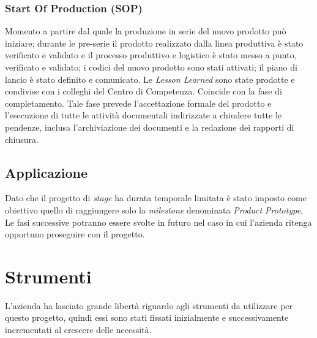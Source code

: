 \subsubsection{Start Of Production (SOP)}
Momento a partire dal quale la produzione in serie
del nuovo prodotto può iniziare; durante le pre-serie il prodotto realizzato dalla
linea produttiva è stato verificato e validato e il processo produttivo e logistico è
stato messo a punto, verificato e validato; i codici del nuovo prodotto sono stati
attivati; il piano di lancio è stato definito e comunicato. Le \emph{Lesson Learned} sono
state prodotte e condivise con i colleghi del Centro di Competenza. Coincide con la fase di completamento. Tale fase prevede l’accettazione formale del prodotto
e l’esecuzione di tutte le attività documentali indirizzate a chiudere tutte
le pendenze, inclusa l’archiviazione dei documenti e la redazione dei rapporti di
chiusura.\\


\subsection{Applicazione}
Dato che il progetto di \emph{stage} ha durata temporale limitata è stato imposto come obiettivo quello di raggiungere solo la \emph{milestone} denominata \emph{Product Prototype}. Le fasi successive potranno essere svolte in futuro nel caso in cui l'azienda ritenga opportuno proseguire con il progetto.


\section{Strumenti}
L'azienda ha lasciato grande libertà riguardo agli strumenti da utilizzare per questo progetto, quindi essi sono stati fissati inizialmente e successivamente incrementati al crescere delle necessità.

